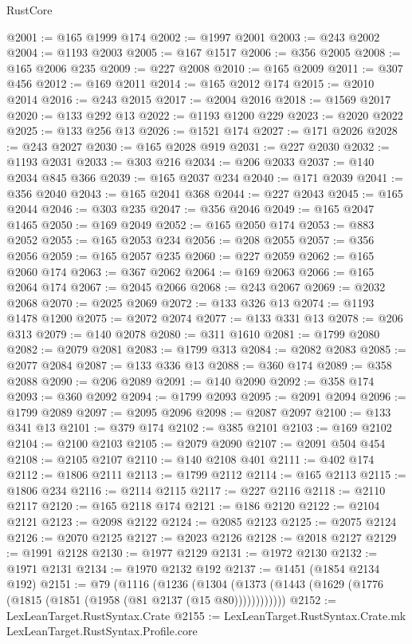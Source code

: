 \begin{lexlean}{RustCore}
\begin{coremodule}
@2001 := @165 @1999 @174
@2002 := @1997 @2001
@2003 := @243 @2002
@2004 := @1193 @2003
@2005 := @167 @1517
@2006 := @356 @2005
@2008 := @165 @2006 @235
@2009 := @227 @2008
@2010 := @165 @2009
@2011 := @307 @456
@2012 := @169 @2011
@2014 := @165 @2012 @174
@2015 := @2010 @2014
@2016 := @243 @2015
@2017 := @2004 @2016
@2018 := @1569 @2017
@2020 := @133 @292 @13
@2022 := @1193 @1200 @229
@2023 := @2020 @2022
@2025 := @133 @256 @13
@2026 := @1521 @174
@2027 := @171 @2026
@2028 := @243 @2027
@2030 := @165 @2028 @919
@2031 := @227 @2030
@2032 := @1193 @2031
@2033 := @303 @216
@2034 := @206 @2033
@2037 := @140 @2034 @845 @366
@2039 := @165 @2037 @234
@2040 := @171 @2039
@2041 := @356 @2040
@2043 := @165 @2041 @368
@2044 := @227 @2043
@2045 := @165 @2044
@2046 := @303 @235
@2047 := @356 @2046
@2049 := @165 @2047 @1465
@2050 := @169 @2049
@2052 := @165 @2050 @174
@2053 := @883 @2052
@2055 := @165 @2053 @234
@2056 := @208 @2055
@2057 := @356 @2056
@2059 := @165 @2057 @235
@2060 := @227 @2059
@2062 := @165 @2060 @174
@2063 := @367 @2062
@2064 := @169 @2063
@2066 := @165 @2064 @174
@2067 := @2045 @2066
@2068 := @243 @2067
@2069 := @2032 @2068
@2070 := @2025 @2069
@2072 := @133 @326 @13
@2074 := @1193 @1478 @1200
@2075 := @2072 @2074
@2077 := @133 @331 @13
@2078 := @206 @313
@2079 := @140 @2078
@2080 := @311 @1610
@2081 := @1799 @2080
@2082 := @2079 @2081
@2083 := @1799 @313
@2084 := @2082 @2083
@2085 := @2077 @2084
@2087 := @133 @336 @13
@2088 := @360 @174
@2089 := @358 @2088
@2090 := @206 @2089
@2091 := @140 @2090
@2092 := @358 @174
@2093 := @360 @2092
@2094 := @1799 @2093
@2095 := @2091 @2094
@2096 := @1799 @2089
@2097 := @2095 @2096
@2098 := @2087 @2097
@2100 := @133 @341 @13
@2101 := @379 @174
@2102 := @385 @2101
@2103 := @169 @2102
@2104 := @2100 @2103
@2105 := @2079 @2090
@2107 := @2091 @504 @454
@2108 := @2105 @2107
@2110 := @140 @2108 @401
@2111 := @402 @174
@2112 := @1806 @2111
@2113 := @1799 @2112
@2114 := @165 @2113
@2115 := @1806 @234
@2116 := @2114 @2115
@2117 := @227 @2116
@2118 := @2110 @2117
@2120 := @165 @2118 @174
@2121 := @186 @2120
@2122 := @2104 @2121
@2123 := @2098 @2122
@2124 := @2085 @2123
@2125 := @2075 @2124
@2126 := @2070 @2125
@2127 := @2023 @2126
@2128 := @2018 @2127
@2129 := @1991 @2128
@2130 := @1977 @2129
@2131 := @1972 @2130
@2132 := @1971 @2131
@2134 := @1970 @2132 @192
@2137 := @1451 (@1854 @2134 @192)
@2151 := @79
    (@1116
      (@1236 (@1304 (@1373 (@1443 (@1629 (@1776 (@1815 (@1851 (@1958 (@81 @2137 (@15 @80))))))))))))
@2152 := LexLeanTarget.RustSyntax.Crate
@2155 := LexLeanTarget.RustSyntax.Crate.mk LexLeanTarget.RustSyntax.Profile.core

\end{coremodule}
\end{lexlean}

